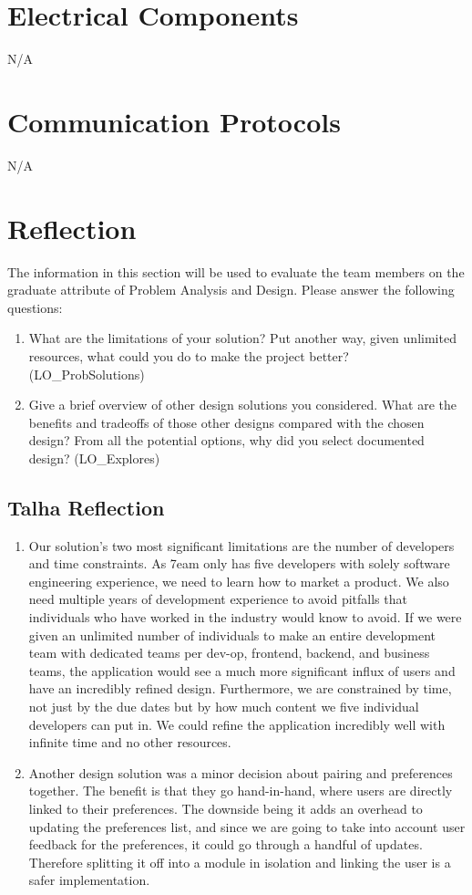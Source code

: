 \documentclass[12pt, titlepage]{article}
\begin{document}
\section{Electrical Components}
N/A

\section{Communication Protocols}
N/A

\section{Reflection}

The information in this section will be used to evaluate the team members on the
graduate attribute of Problem Analysis and Design.  Please answer the following questions:

\begin{enumerate}
  \item What are the limitations of your solution?  Put another way, given
  unlimited resources, what could you do to make the project better? (LO\_ProbSolutions)
  \item Give a brief overview of other design solutions you considered.  What
  are the benefits and tradeoffs of those other designs compared with the chosen
  design?  From all the potential options, why did you select documented design?
  (LO\_Explores)
\end{enumerate}

\subsection{Talha Reflection}
\begin{enumerate}
	\item Our solution's two most significant limitations are the number of developers and time constraints. As 7eam only has five developers with solely software engineering experience, we need to learn how to market a product. We also need multiple years of development experience to avoid pitfalls that individuals who have worked in the industry would know to avoid. If we were given an unlimited number of individuals to make an entire development team with dedicated teams per dev-op, frontend, backend, and business teams, the application would see a much more significant influx of users and have an incredibly refined design. Furthermore, we are constrained by time, not just by the due dates but by how much content we five individual developers can put in. We could refine the application incredibly well with infinite time and no other resources.
	
	\item Another design solution was a minor decision about pairing and preferences together. The benefit is that they go hand-in-hand, where users are directly linked to their preferences. The downside being it adds an overhead to updating the preferences list, and since we are going to take into account user feedback for the preferences, it could go through a handful of updates. Therefore splitting it off into a module in isolation and linking the user is a safer implementation.
\end{enumerate}
\end{document}
